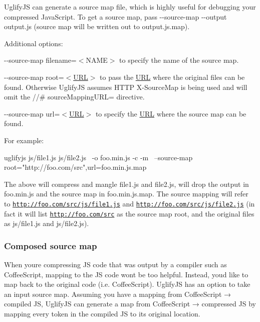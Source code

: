 Uglify\+JS can generate a source map file, which is highly useful for debugging your compressed Java\+Script. To get a source map, pass {\ttfamily -\/-\/source-\/map -\/-\/output output.\+js} (source map will be written out to {\ttfamily output.\+js.\+map}).

Additional options\+:


\begin{DoxyItemize}
\item {\ttfamily -\/-\/source-\/map filename=$<$N\+A\+ME$>$} to specify the name of the source map.
\item {\ttfamily -\/-\/source-\/map root=$<$\mbox{\hyperlink{namespace_u_r_l}{U\+RL}}$>$} to pass the \mbox{\hyperlink{namespace_u_r_l}{U\+RL}} where the original files can be found. Otherwise Uglify\+JS assumes H\+T\+TP {\ttfamily X-\/\+Source\+Map} is being used and will omit the {\ttfamily //\# source\+Mapping\+U\+RL=} directive.
\item {\ttfamily -\/-\/source-\/map url=$<$\mbox{\hyperlink{namespace_u_r_l}{U\+RL}}$>$} to specify the \mbox{\hyperlink{namespace_u_r_l}{U\+RL}} where the source map can be found.
\end{DoxyItemize}

For example\+: \begin{DoxyVerb}uglifyjs js/file1.js js/file2.js \
         -o foo.min.js -c -m \
         --source-map root="http://foo.com/src",url=foo.min.js.map
\end{DoxyVerb}


The above will compress and mangle {\ttfamily file1.\+js} and {\ttfamily file2.\+js}, will drop the output in {\ttfamily foo.\+min.\+js} and the source map in {\ttfamily foo.\+min.\+js.\+map}. The source mapping will refer to {\ttfamily \href{http://foo.com/src/js/file1.js}{\tt http\+://foo.\+com/src/js/file1.\+js}} and {\ttfamily \href{http://foo.com/src/js/file2.js}{\tt http\+://foo.\+com/src/js/file2.\+js}} (in fact it will list {\ttfamily \href{http://foo.com/src}{\tt http\+://foo.\+com/src}} as the source map root, and the original files as {\ttfamily js/file1.\+js} and {\ttfamily js/file2.\+js}).

\subsubsection*{Composed source map}

When you\textquotesingle{}re compressing JS code that was output by a compiler such as Coffee\+Script, mapping to the JS code won\textquotesingle{}t be too helpful. Instead, you\textquotesingle{}d like to map back to the original code (i.\+e. Coffee\+Script). Uglify\+JS has an option to take an input source map. Assuming you have a mapping from Coffee\+Script → compiled JS, Uglify\+JS can generate a map from Coffee\+Script → compressed JS by mapping every token in the compiled JS to its original location.

